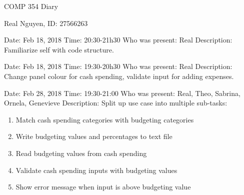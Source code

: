 \documentclass{article}
\begin{document}
 
\begin{center}
    COMP 354 Diary
\end{center}
 
\begin{center}
    Real Nguyen, ID: 27566263
\end{center}
 
\begin{flushleft}
Date: Feb 18, 2018 \newline
Time: 20:30-21h30 \newline
Who was present: Real\newline
Description: Familiarize self with code structure.\newline
\end{flushleft}
 
\begin{flushleft}
Date: Feb 18, 2018 \newline
Time: 19:30-20h30 \newline
Who was present: Real\newline
Description: Change panel colour for cash spending, validate input for adding expenses.\newline
\end{flushleft}
 
\begin{flushleft}
Date: Feb 28, 2018 \newline
Time: 19:30-21:00 \newline
Who was present: Real, Theo, Sabrina, Ornela, Genevieve\newline
Description: Split up use case into multiple sub-tasks:
\begin{enumerate}
  \item Match cash spending categories with budgeting categories
  \item Write budgeting values and percentages to text file
  \item Read budgeting values from cash spending
  \item Validate cash spending inputs with budgeting values
  \item Show error message when input is above budgeting value
\end{enumerate}
\end{flushleft}
 
\end{document}
